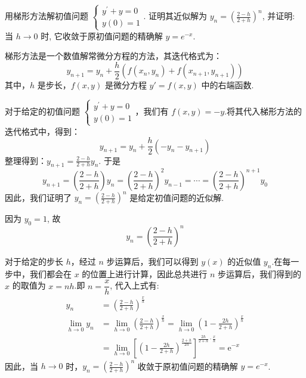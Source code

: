 \begin{tcolorbox}[breakable,
		colframe=white!10!jingga, coltitle=white!90!jingga, colback=white!95!jingga, coltext=black, colbacktitle=white!10!jingga, enhanced, fonttitle=\bfseries,fontupper=\normalsize, attach boxed title to top left={yshift=-2mm}, before skip=8pt, after skip=8pt,
		title=解答题]

     用梯形方法解初值问题 $ \left\{\begin{array}{l}y^{\prime}+y=0 \\ y(0)=1\end{array}\right. $. 证明其近似解为 $ y_{n}=\left(\frac{2-h}{2+h}\right)^{n} $, 并证明: 当 $ h \rightarrow 0 $ 时, 它收敛于原初值问题的精确解 $ y=e^{-x} $.

     \tcblower

梯形方法是一个数值解常微分方程的方法，其迭代格式为：
$$ y_{n+1} = y_n + \frac{h}{2}(f(x_n, y_n) + f(x_{n+1}, y_{n+1})) $$
其中，$ h $ 是步长，$ f(x, y) $ 是微分方程 $ y' = f(x, y) $ 中的右端函数.

对于给定的初值问题 $ \left\{\begin{array}{l}y^{\prime}+y=0 \\ y(0)=1\end{array}\right. $，我们有 $ f(x, y) = -y $.将其代入梯形方法的迭代格式中，得到：
$$ y_{n+1} = y_n + \frac{h}{2}(-y_n - y_{n+1}) $$
整理得到：$ y_{n+1} = \frac{2-h}{2+h}y_n $. 于是
$$
y_{n+1}=\left(\frac{2-h}{2+h}\right) y_{n}=\left(\frac{2-h}{2+h}\right)^{2} y_{n-1}=\cdots=\left(\frac{2-h}{2+h}\right)^{n+1} y_{0}
$$
因此，我们证明了 $ y_{n}=\left(\frac{2-h}{2+h}\right)^{n} $ 是给定初值问题的近似解.

因为 $ y_{0}=1 $, 故
$$
y_{n}=\left(\frac{2-h}{2+h}\right)^{n}
$$

对于给定的步长 $ h $，经过 $ n $ 步运算后，我们可以得到 $ y(x) $ 的近似值 $ y_n$.在每一步中，我们都会在 $ x $ 的位置上进行计算，因此总共进行 $ n $ 步运算后，我们得到的 $ x $ 的取值为 $ x = nh $.即 $ n=\dfrac{x}{h} $, 代入上式有:
$$
\begin{aligned}
y_{n}&=\left(\frac{2-h}{2+h}\right)^{\frac x  h} \\
\lim _{h \rightarrow 0} y_{n}&=\lim _{h \rightarrow 0}\left(\frac{2-h}{2+h}\right)^{\frac{x}{h}}=\lim _{h \rightarrow 0}\left(1-\frac{2 h}{2+h}\right)^{\frac{x}{h}} \\
&=\lim _{h \rightarrow 0}\left[\left(1-\frac{2 h}{2+h}\right)^{\frac{2+h}{2 h}}\right]^{\frac{2 h}{2+h}\cdot \frac{x}{h}}=\mathrm{e}^{-x}
\end{aligned}
$$
因此，当 $ h \rightarrow 0 $ 时，$ y_{n}=\left(\frac{2-h}{2+h}\right)^{n} $ 收敛于原初值问题的精确解 $ y=e^{-x} $.
\end{tcolorbox}


